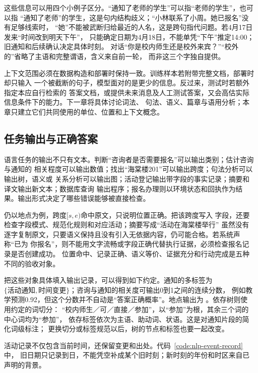 这些信息可以用四个小例子区分。“通知了老师的学生”可以指“老师的学生”，也可以指
“通知了老师”的学生，这是句内结构歧义；“小林联系了小周。她已报名”没有足够线索时，
“她”不能被武断归给最近的人名，这是跨句指代问题。若4月17日发来“时间改到明天下午”，
只能确定日期为4月18日，不能单凭“下午”推定14:00；旧通知和后续确认决定具体时刻。
对话“你是校内师生还是校外来宾？”“校外的”省略了主语和完整谓语，含义来自前一轮，
而非这三个字独自提供。

上下文范围必须在数据构造和部署时保持一致。训练样本若附带完整文档，部署时却只输入
一个被截断的句子，模型面对的是更少的信息。反过来，测试时若额外指定本应自行检索的
答案文档，或提供未来消息及人工测试答案，又会高估实际信息条件下的能力。下一章将具体讨论词法、
句法、语义、篇章与语用分析；本章只建立它们共同使用的单位、位置和上下文概念。

\subsection{任务输出与正确答案}
\label{sec:nlp-outputs-and-correctness}

语言任务的输出不只有文本。判断“咨询者是否需要报名”可以输出类别；估计咨询与通知的
相关程度可以输出数值；找出“海棠楼201”可以输出跨度；句法分析可以输出树，语义或
关系分析可以输出图；活动登记输出带字段的事实记录；摘要和译文输出新文本；数据库查询
输出程序；报名办理则以环境状态和回执作为结果。输出形式决定了哪些错误能够被直接检查。

仍以地点为例，跨度$[s,e)$命中原文，只说明位置正确。把该跨度写入
字段，还要检查字段模式、规范化规则和对应活动；摘要写成“活动在海棠楼举行”
虽然没有逐字复制原文，只要语义保持且没有引入无依据内容，仍可能合格。若系统声称“已为
你报名”，则不能用文字流畅或字段正确代替执行证据，必须检查报名记录是否创建成功。
位置命中、记录正确、语义等价、证据充分和行动完成是五种不同的验收对象。

把这些对象具体填入输出记录，可以得到如下约定。通知的多标签为
$\{\text{活动通知},\text{时间变更}\}$；咨询与通知的相关度可输出0到1之间的连续分数，
例如教学预测0.92，但这个分数并不自动是“答案正确概率”。地点输出为
\code{type=LOC, span=[39,45), text=海棠楼201}。依存树则使用约定的词切分：
“校内师生／可／直接／参加”，以“参加”为根，其余三个词的中心词均为“参加”，
依存标签依次为主语、助动词、状语。这是对通知片段的简化词级标注；
更换切分或标签规范以后，树的节点和标签也要一起改变。

活动记录不仅包含当前时间，还保留变更和出处。代码~\ref{code:nlp-event-record}中，
旧日期只记录到日，不能凭空补成某个旧时刻；新时刻的年份和时区来自已声明的背景。

